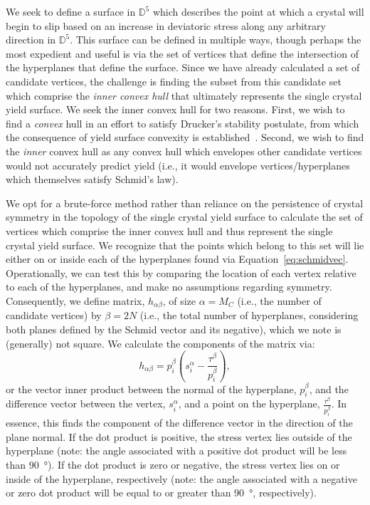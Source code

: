 \documentclass[preprint,3p,times,sort&compress,letterpaper,12pt]{elsarticle} %
\begin{document}
We seek to define a surface in $\mathbb{D}^5$ which describes the point at which a crystal will begin to slip based on an increase in deviatoric stress along any arbitrary direction in $\mathbb{D}^5$. This surface can be defined in multiple ways, though perhaps the most expedient and useful is via the set of vertices that define the intersection of the hyperplanes that define the surface. Since we have already calculated a set of candidate vertices, the challenge is finding the subset from this candidate set which comprise the {\emph{inner convex hull}} that ultimately represents the single crystal yield surface. We seek the inner convex hull for two reasons. First, we wish to find a {\emph{convex}} hull in an effort to satisfy Drucker's stability postulate, from which the consequence of yield surface convexity is established~\cite{Drucker1959}. Second, we wish to find the {\emph{inner}} convex hull as any convex hull which envelopes other candidate vertices would not accurately predict yield (i.e., it would envelope vertices/hyperplanes which themselves satisfy Schmid's law).

We opt for a brute-force method rather than reliance on the persistence of crystal symmetry in the topology of the single crystal yield surface to calculate the set of vertices which comprise the inner convex hull and thus represent the single crystal yield surface. We recognize that the points which belong to this set will lie either on or inside each of the hyperplanes found via Equation~\ref{eq:schmidvec}. Operationally, we can test this by comparing the location of each vertex relative to each of the hyperplanes, and make no assumptions regarding symmetry. Consequently, we define matrix, $h_{\alpha \beta}$, of size $\alpha = M_C$ (i.e., the number of candidate vertices) by $\beta = 2N$ (i.e., the total number of hyperplanes, considering both planes defined by the Schmid vector and its negative), which we note is (generally) not square. We calculate the components of the matrix via:
\begin{equation}
    \label{eq:hab}
    h_{\alpha \beta} = p^\beta_i\left(s_i^\alpha - \frac{\tau^\beta}{p_i^\beta}\right), 
\end{equation}
or the vector inner product between the normal of the hyperplane, $p_i^\beta$, and the difference vector between the vertex, $s_i^\alpha$, and a point on the hyperplane, $\frac{\tau^\beta}{p_i^\beta}$. In essence, this finds the component of the difference vector in the direction of the plane normal. If the dot product is positive, the stress vertex lies outside of the hyperplane (note: the angle associated with a positive dot product will be less than \SI{90}{\degree}). If the dot product is zero or negative, the stress vertex lies on or inside of the hyperplane, respectively (note: the angle associated with a negative or zero dot product will be equal to or greater than \SI{90}{\degree}, respectively).
\end{document}
